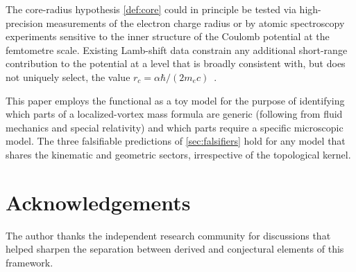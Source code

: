 \documentclass[11pt, a4paper]{article}
\newcommand{\rc}{r_c}        %
\begin{document}
The core-radius hypothesis \cref{def:core} could in principle
be tested via high-precision measurements of the electron charge
radius or by atomic spectroscopy experiments sensitive to the
inner structure of the Coulomb potential at the femtometre scale.
Existing Lamb-shift data constrain any additional short-range
contribution to the potential at a level that is broadly
consistent with, but does not uniquely select, the value
$\rc = \alpha\hbar/(2m_e c)$~\cite{Bethe1947,Karshenboim2005}.

This paper employs the functional as a toy model for the
purpose of identifying which parts of a localized-vortex mass
formula are generic (following from fluid mechanics and
special relativity) and which parts require a specific
microscopic model.
The three falsifiable predictions of \cref{sec:falsifiers}
hold for any model that shares the kinematic and geometric
sectors, irrespective of the topological kernel.

\section*{Acknowledgements}

The author thanks the independent research community for
discussions that helped sharpen the separation between derived
and conjectural elements of this framework.
\end{document}
